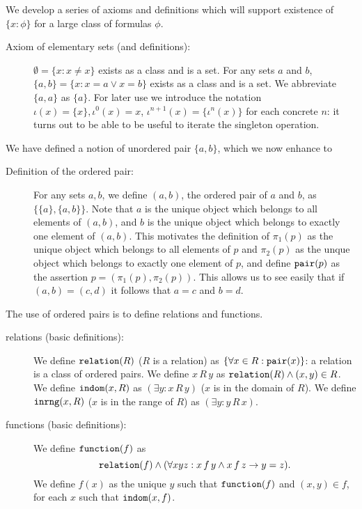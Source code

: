 \documentclass[12pt]{article}
\begin{document}
We develop a series of axioms and definitions which will support existence of $\{x:\phi\}$ for a large class of formulas $\phi$.

\begin{description}

\item[Axiom of elementary sets (and definitions):]  $\emptyset = \{x:x \neq x\}$ exists as a class and is a set.  For any sets $a$ and $b$, $\{a,b\} = \{x:x=a \vee x=b\}$ exists as a class and is a set.   We abbreviate $\{a,a\}$ as $\{a\}$.  For later use we introduce the notation $\iota(x)=\{x\}, \iota^0(x) = x$, $\iota^{n+1}(x) = \{\iota^n(x)\}$ for each concrete $n$:  it turns out to be able to be useful to iterate the singleton operation.

\end{description}

We have defined a notion of unordered pair $\{a,b\}$, which we now enhance to

\begin{description}

\item[Definition of the ordered pair:]  For any sets $a,b$, we define $(a,b)$, the ordered pair of $a$ and $b$, as $\{\{a\},\{a,b\}\}$.  Note that
$a$ is the unique object which belongs to all elements of $(a,b)$, and $b$ is the unique object which belongs to exactly one element of $(a,b)$.  This motivates the definition of $\pi_1(p)$ as the unique object which belongs to all elements of $p$ and $\pi_2(p)$ as the unque object which belongs to exactly one element of $p$,
and define ${\tt pair}(p)$ as the assertion $p= (\pi_1(p),\pi_2(p))$.  This allows us to see easily that if $(a,b) = (c,d)$ it follows that $a=c$ and $b=d$.

\end{description}

The use of ordered pairs is to define relations and functions.

\begin{description}

\item[relations (basic definitions):]  We define ${\tt relation}(R)$ ($R$ is a relation) as $\{\forall x \in R:{\tt pair}(x)\}$:  a relation is a class of ordered pairs.
We define $x \, R \, y$ as ${\tt relation}(R) \wedge (x,y)\in R$.  We define ${\tt indom}(x,R)$ as $(\exists y:x \, R\, y)$ ($x$ is in the domain of $R$).   We define ${\tt inrng}(x,R)$ ($x$ is in the range of $R$) as $(\exists y:y \, R \, x)$.

\item[functions (basic definitions):]  We define ${\tt function}(f)$ as $${\tt relation}(f) \wedge (\forall xyz:x \, f \, y \wedge x \, f \, z \rightarrow y=z).$$  We define
$f(x)$ as the unique $y$ such that ${\tt function}(f)$ and $(x,y)\in f$, for each $x$ such that ${\tt indom}(x,f)$.
\end{description}
\end{document}
